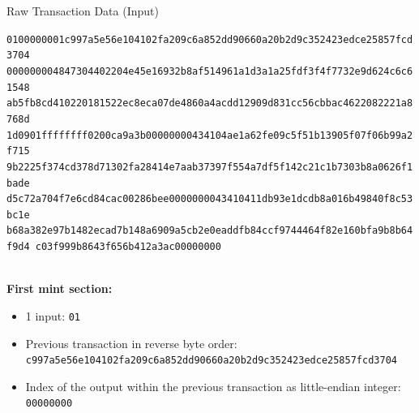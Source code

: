 \documentclass[]{beamer}
\begin{document}
\begin{frame}{Raw Transaction Data (Input)}
\begin{scriptsize}
\texttt{\textcolor{black!50}{01000000}{\alert<1>{01}\alert<2>{c997a5e56e104102fa209c6a852dd90660a20b2d9c352423edce25857fcd3704}
\alert<3>{00000000}}\textcolor{black!50}{4847304402204e45e16932b8af514961a1d3a1a25fdf3f4f7732e9d624c6c61548
ab5fb8cd410220181522ec8eca07de4860a4acdd12909d831cc56cbbac4622082221a8768d
1d0901ffffffff0200ca9a3b00000000434104ae1a62fe09c5f51b13905f07f06b99a2f715
9b2225f374cd378d71302fa28414e7aab37397f554a7df5f142c21c1b7303b8a0626f1bade
d5c72a704f7e6cd84cac00286bee0000000043410411db93e1dcdb8a016b49840f8c53bc1e
b68a382e97b1482ecad7b148a6909a5cb2e0eaddfb84ccf9744464f82e160bfa9b8b64f9d4
c03f999b8643f656b412a3ac00000000}}
\end{scriptsize}
\vspace{1em}
\scriptsize \\
\textbf{First mint section:}\\
\begin{itemize}
	\item \alert<1>{1 input: \texttt{01}}
	\item \alert<2>{Previous transaction in reverse byte order: \texttt{c997a5e56e104102fa209c6a852dd90660a20b2d9c352423edce25857fcd3704}}
	\item \alert<3>{Index of the output within the previous transaction as little-endian integer: \texttt{00000000}}
\end{itemize}
\end{frame}
\end{document}
